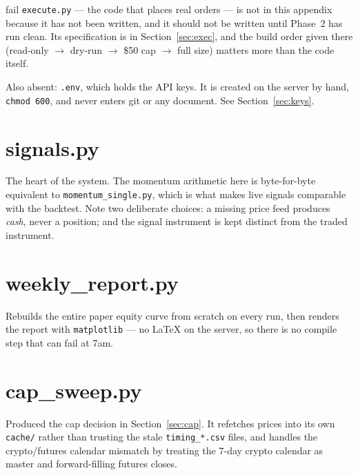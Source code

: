 \documentclass[11pt,a4paper]{article}
\begin{document}
\vspace{0.8em}
\begin{resultbox}{fail}
\texttt{execute.py} --- the code that places real orders --- is not in
this appendix because it has not been written, and it should not be
written until Phase~2 has run clean. Its specification is in
Section~\ref{sec:exec}, and the build order given there
(read-only $\rightarrow$ dry-run $\rightarrow$ \$50 cap $\rightarrow$
full size) matters more than the code itself.

\vspace{0.4em}
Also absent: \texttt{.env}, which holds the API keys. It is created on
the server by hand, \texttt{chmod 600}, and never enters git or any
document. See Section~\ref{sec:keys}.
\end{resultbox}

\section{signals.py}

The heart of the system. The momentum arithmetic here is byte-for-byte
equivalent to \texttt{momentum\_single.py}, which is what makes live
signals comparable with the backtest. Note two deliberate choices: a
missing price feed produces \emph{cash}, never a position; and the
signal instrument is kept distinct from the traded instrument.



\section{weekly\_report.py}

Rebuilds the entire paper equity curve from scratch on every run, then
renders the report with \texttt{matplotlib} --- no LaTeX on the server,
so there is no compile step that can fail at 7am.



\section{cap\_sweep.py}

Produced the cap decision in Section~\ref{sec:cap}. It refetches prices
into its own \texttt{cache/} rather than trusting the stale
\texttt{timing\_*.csv} files, and handles the crypto/futures calendar
mismatch by treating the 7-day crypto calendar as master and
forward-filling futures closes.
\end{document}
